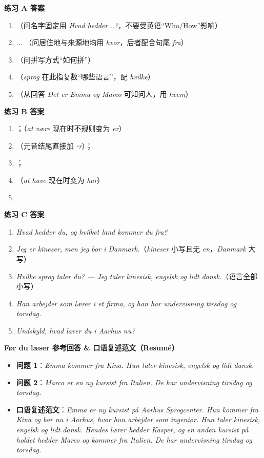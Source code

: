 \begin{answerbox}
\textbf{练习 A 答案}
\begin{enumerate}
  \item {}（问名字固定用 \textit{Hvad hedder...?}，不要受英语“Who/How”影响）
  \item {} ... （问居住地与来源地均用 \textit{hvor}，后者配合句尾 \textit{fra}）
  \item {}（问拼写方式“如何拼”）
  \item {}（\textit{sprog} 在此指复数“哪些语言”，配 \textit{hvilke}）
  \item {}（从回答 \textit{Det er Emma og Marco} 可知问人，用 \textit{hvem}）
\end{enumerate}

\textbf{练习 B 答案}
\begin{enumerate}
  \item {}；（\textit{at være} 现在时不规则变为 \textit{er}）
  \item {}（元音结尾直接加 \textit{-r}）；
  \item {}；
  \item {}（\textit{at have} 现在时变为 \textit{har}）
  \item {}
\end{enumerate}

\textbf{练习 C 答案}
\begin{enumerate}
  \item \textit{Hvad hedder du, og hvilket land kommer du fra?}
  \item \textit{Jeg er kineser, men jeg bor i Danmark.}（\textit{kineser} 小写且无 \textit{en}，\textit{Danmark} 大写）
  \item \textit{Hvilke sprog taler du? --- Jeg taler kinesisk, engelsk og lidt dansk.}（语言全部小写）
  \item \textit{Han arbejder som lærer i et firma, og han har undervisning tirsdag og torsdag.}
  \item \textit{Undskyld, hvad laver du i Aarhus nu?}
\end{enumerate}

\textbf{Før du læser 参考回答 \& 口语复述范文（Resumé）}
\begin{itemize}
  \item \textbf{问题 1}：\textit{Emma kommer fra Kina. Hun taler kinesisk, engelsk og lidt dansk.}
  \item \textbf{问题 2}：\textit{Marco er en ny kursist fra Italien. De har undervisning tirsdag og torsdag.}
  \item \textbf{口语复述范文}：\textit{Emma er ny kursist på Aarhus Sprogcenter. Hun kommer fra Kina og bor nu i Aarhus, hvor hun arbejder som ingeniør. Hun taler kinesisk, engelsk og lidt dansk. Hendes lærer hedder Kasper, og en anden kursist på holdet hedder Marco og kommer fra Italien. De har undervisning tirsdag og torsdag.}
\end{itemize}
\end{answerbox}
